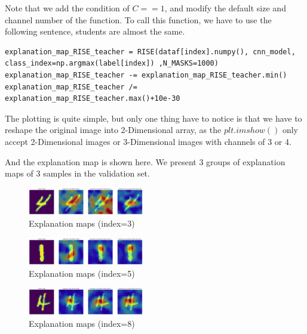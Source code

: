 \documentclass[conference]{IEEEtran}
\begin{document}
  Note that we add the condition of $C==1$, and modify the default size and channel number of the function. To call this function, we have to use the following sentence, students are almost the same.
  \begin{lstlisting}
explanation_map_RISE_teacher = RISE(dataf[index].numpy(), cnn_model, class_index=np.argmax(label[index]) ,N_MASKS=1000)
explanation_map_RISE_teacher -= explanation_map_RISE_teacher.min()
explanation_map_RISE_teacher /= explanation_map_RISE_teacher.max()+10e-30
\end{lstlisting}

The plotting is quite simple, but only one thing have to notice is that we have to reshape the original image into 2-Dimensional array, as the $plt.imshow()$ only accept 2-Dimensional images or 3-Dimensional images with channels of 3 or 4.

  And the explanation map is shown here. We present 3 groups of explanation maps of 3 samples in the validation set.
  
    \begin{figure}[h] 
      \centering
      \includegraphics[width=0.45\textwidth]{./graphs/xai-3.png}
      \caption{Explanation maps (index=3)}
      \label{Fig.xai-3}
  \end{figure}
  
    \begin{figure}[h] 
      \centering
      \includegraphics[width=0.45\textwidth]{./graphs/xai-5.png}
      \caption{Explanation maps (index=5)}
      \label{Fig.xai-5}
  \end{figure}
  
    \begin{figure}[h] 
      \centering
      \includegraphics[width=0.45\textwidth]{./graphs/xai-8.png}
      \caption{Explanation maps (index=8)}
      \label{Fig.xai-8}
  \end{figure}
  
\end{document}
